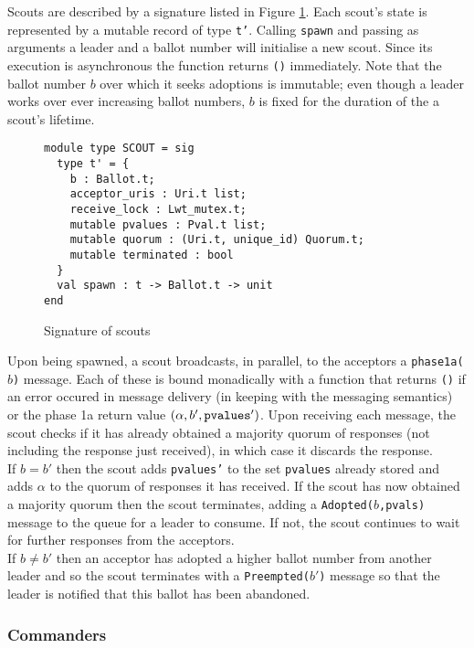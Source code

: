 Scouts are described by a signature listed in Figure \ref{fig:scout-sig}. Each scout's state is represented by a mutable record of type \texttt{t'}. Calling \texttt{spawn} and passing as arguments a leader and a ballot number will initialise a new scout. Since its execution is asynchronous the function returns \texttt{()} immediately. Note that the ballot number $b$ over which it seeks adoptions is immutable; even though a leader works over ever increasing ballot numbers, $b$ is fixed for the duration of the a scout's lifetime.  \\

\begin{figure}
  \begin{lstlisting}
module type SCOUT = sig
  type t' = {
    b : Ballot.t;
    acceptor_uris : Uri.t list;
    receive_lock : Lwt_mutex.t;  
    mutable pvalues : Pval.t list;
    mutable quorum : (Uri.t, unique_id) Quorum.t;
    mutable terminated : bool
  }
  val spawn : t -> Ballot.t -> unit
end
  \end{lstlisting}
  \centering
  \caption{Signature of scouts}
  \label{fig:scout-sig}
\end{figure}

Upon being spawned, a scout broadcasts, in parallel, to the acceptors a \texttt{phase1a($b$)} message. Each of these is bound monadically with a function that returns \texttt{()} if an error occured in message delivery (in keeping with the messaging semantics) or the phase 1a return value $(\alpha, b', \textrm{\texttt{pvalues}}')$. Upon receiving each message, the scout checks if it has already obtained a majority quorum of responses (not including the response just received), in which case it discards the response. \\

If $b = b'$ then the scout adds \texttt{pvalues'} to the set \texttt{pvalues} already stored and adds $\alpha$ to the quorum of responses it has received. If the scout has now obtained a majority quorum then the scout terminates, adding a \texttt{Adopted($b$,pvals)} message to the queue for a leader to consume. If not, the scout continues to wait for further responses from the acceptors. \\

If $b \neq b'$ then an acceptor has adopted a higher ballot number from another leader and so the scout terminates with a \texttt{Preempted($b'$)} message so that the leader is notified that this ballot has been abandoned.

\subsubsection{Commanders}

